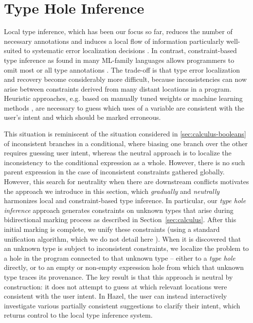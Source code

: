 \section{Type Hole Inference}
\label{sec:thi}

Local type inference, which has been our focus so far, reduces the number of necessary annotations and induces a local flow of information particularly well-suited to systematic error localization decisions \cite{BidirTyping,Pierce:2000:LTI:345099.345100}. In contrast, 
constraint-based type inference as found in many ML-family languages allows programmers to omit most or all type annotations \cite{Pierce:2000:LTI:345099.345100}. The trade-off is that type error localization and recovery 
become considerably more difficult, because inconsistencies can now arise between 
constraints derived from many distant locations in a program. 
Heuristic approaches, e.g. based on manually tuned weights or machine learning methods \cite{Seidel2016}, are necessary to guess which uses of a variable are consistent with the user's intent and which should be marked erroneous.

This situation is reminiscent of the situation considered in \cref{sec:calculus-booleans} of inconsistent branches in a conditional, where biasing one branch over the other requires guessing user intent, whereas the neutral approach is to localize the inconsistency to the conditional expression as a whole. However, there is no such parent expression in the case of inconsistent constraints gathered globally. However,
this search for neutrality when there are downstream conflicts motivates the approach we introduce in this section, which \emph{gradually} and \emph{neutrally} harmonizes local and constraint-based type inference. In particular, our \emph{type hole inference} approach generates constraints on unknown types that arise during bidirectional marking process as described in Section~\ref{sec:calculus}. After this initial marking is complete, we unify these constraints (using a standard unification algorithm, which we do not detail here \cite{Huet}). When it is discovered that an unknown type is subject to inconsistent constraints, we localize the problem 
to a hole in the program connected to that unknown type -- either to a \emph{type hole} directly, or to an empty or non-empty expression hole from which that unknown type traces its provenance. The key result is that this approach is neutral by construction: it does not attempt to guess at which relevant locations were consistent with the user intent. In Hazel, the user can instead interactively investigate various partially consistent suggestions to clarify their intent, which returns control to the local type inference system.

